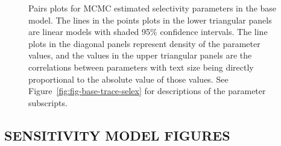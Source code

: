 \documentclass[11pt]{book}
\begin{document}
\begin{figure}[H]

{\centering {} 

}

\caption{Pairs plots for MCMC estimated selectivity parameters in the base model. The lines in the points plots in the lower triangular panels are linear models with shaded 95\% confidence intervals. The line plots in the diagonal panels represent density of the parameter values, and the values in the upper triangular panels are the correlations between parameters with text size being directly proportional to the absolute value of those values. See Figure~\ref{fig:fig-base-trace-selex} for descriptions of the parameter subscripts.}\label{fig:fig-base-pairs-sel}
\end{figure}
\clearpage

\hypertarget{sensitivity-model-figures}{%
\subsection{SENSITIVITY MODEL FIGURES}\label{sensitivity-model-figures}}
\end{document}
